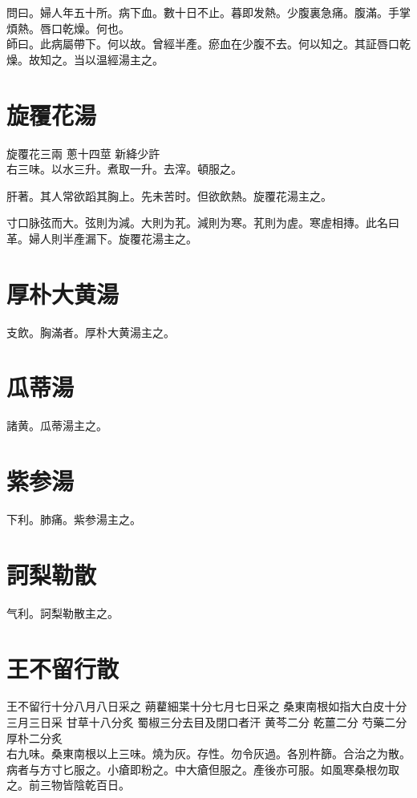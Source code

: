 問曰。婦人年五十所。病下血。數十日不止。暮即发熱。少腹裏急{\khaaitp 痛}。腹滿。手掌煩熱。唇口乾燥。何也。\\
師曰。此病屬帶下。何以故。曾經半產。瘀血在少腹不去。何以知之。其証唇口乾燥。故知之。当以温經湯主之。

\section{旋覆花湯}

旋覆花{\scriptsize 三兩} 蔥{\scriptsize 十四莖} 新絳{\scriptsize 少許}\\
右三味。以水三升。煮取一升。去滓。頓服之。

肝著。其人常欲蹈其胸上。先未苦时。但欲飲熱。旋覆花湯主之。

寸口脉弦而大。弦則为減。大則为芤。減則为寒。芤則为虗。寒虗相摶。此名曰革。婦人則半產漏下。旋覆花湯主之。

\section{厚朴大黄湯}

支飲。胸滿者。厚朴大黄湯主之。

\section{瓜蒂湯}

諸黄。瓜蒂湯主之。

\section{紫参湯}

下利。肺痛。紫参湯主之。

\section{訶梨勒散}

气利。訶梨勒散主之。

\section{王不留行散}

王不留行{\scriptsize 十分八月八日采之} 蒴藋細枼{\scriptsize 十分七月七日采之} 桑東南根{\scriptsize 如指大白皮十分三月三日采} 甘草{\scriptsize 十八分炙} 蜀椒{\scriptsize 三分去目及閉口者汗} 黄芩{\scriptsize 二分} 乾薑{\scriptsize 二分} 芍藥{\scriptsize 二分} 厚朴{\scriptsize 二分炙}\\
右九味。桑東南根以上三味。燒为灰。存性。勿令灰過。各別杵篩。合治之为散。病者与方寸匕服之。小瘡即粉之。中大瘡但服之。產後亦可服。如風寒桑根勿取之。前三物皆陰乾百日。


